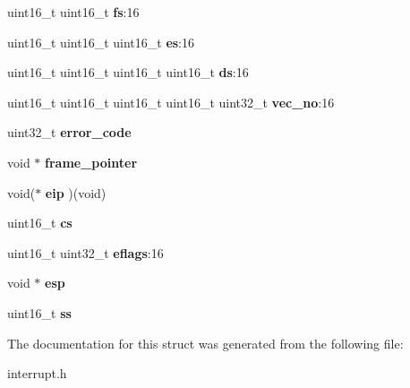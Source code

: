 \begin{DoxyCompactItemize}
\item 
uint16\+\_\+t uint16\+\_\+t {\bfseries fs}\+:16\hypertarget{structintr__frame_a4967c5b3c4ee2ba8161c867d7ba5c9ef}{}\label{structintr__frame_a4967c5b3c4ee2ba8161c867d7ba5c9ef}

\item 
uint16\+\_\+t uint16\+\_\+t uint16\+\_\+t {\bfseries es}\+:16\hypertarget{structintr__frame_a9c32903d5d6a0e5f23d167fdc75b057a}{}\label{structintr__frame_a9c32903d5d6a0e5f23d167fdc75b057a}

\item 
uint16\+\_\+t uint16\+\_\+t uint16\+\_\+t uint16\+\_\+t {\bfseries ds}\+:16\hypertarget{structintr__frame_a9fc5e5d66dbc18aed5360cf2973289da}{}\label{structintr__frame_a9fc5e5d66dbc18aed5360cf2973289da}

\item 
uint16\+\_\+t uint16\+\_\+t uint16\+\_\+t uint16\+\_\+t uint32\+\_\+t {\bfseries vec\+\_\+no}\+:16\hypertarget{structintr__frame_a5220184751c984a6ad28d14ef43183e3}{}\label{structintr__frame_a5220184751c984a6ad28d14ef43183e3}

\item 
uint32\+\_\+t {\bfseries error\+\_\+code}\hypertarget{structintr__frame_a54168d3e26b008b0fc15e033ee76630a}{}\label{structintr__frame_a54168d3e26b008b0fc15e033ee76630a}

\item 
void $\ast$ {\bfseries frame\+\_\+pointer}\hypertarget{structintr__frame_a1b89f0706f01818a1e88cd36b41e8a47}{}\label{structintr__frame_a1b89f0706f01818a1e88cd36b41e8a47}

\item 
void($\ast$ {\bfseries eip} )(void)\hypertarget{structintr__frame_a45b946407a784749cf08cf9144f3b980}{}\label{structintr__frame_a45b946407a784749cf08cf9144f3b980}

\item 
uint16\+\_\+t {\bfseries cs}\hypertarget{structintr__frame_adc947ba61eb2eee7f5a01252fd271e09}{}\label{structintr__frame_adc947ba61eb2eee7f5a01252fd271e09}

\item 
uint16\+\_\+t uint32\+\_\+t {\bfseries eflags}\+:16\hypertarget{structintr__frame_a20b094789ff3ccc8f0f1fa5a7e350491}{}\label{structintr__frame_a20b094789ff3ccc8f0f1fa5a7e350491}

\item 
void $\ast$ {\bfseries esp}\hypertarget{structintr__frame_ac0f61c482c6dee39e39ec3f28833f595}{}\label{structintr__frame_ac0f61c482c6dee39e39ec3f28833f595}

\item 
uint16\+\_\+t {\bfseries ss}\hypertarget{structintr__frame_a27f574cac8439151d57354d344259f57}{}\label{structintr__frame_a27f574cac8439151d57354d344259f57}

\end{DoxyCompactItemize}


The documentation for this struct was generated from the following file\+:\begin{DoxyCompactItemize}
\item 
interrupt.\+h\end{DoxyCompactItemize}
